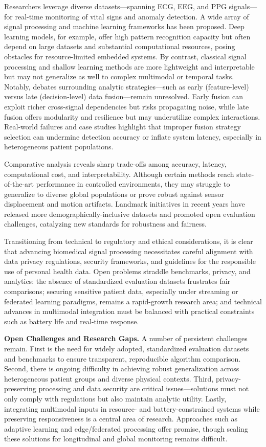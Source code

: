 \documentclass[sigconf]{acmart}
\begin{document}
Researchers leverage diverse datasets—spanning ECG, EEG, and PPG signals—for real-time monitoring of vital signs and anomaly detection. A wide array of signal processing and machine learning frameworks has been proposed. Deep learning models, for example, offer high pattern recognition capacity but often depend on large datasets and substantial computational resources, posing obstacles for resource-limited embedded systems. By contrast, classical signal processing and shallow learning methods are more lightweight and interpretable but may not generalize as well to complex multimodal or temporal tasks. Notably, debates surrounding analytic strategies—such as early (feature-level) versus late (decision-level) data fusion—remain unresolved. Early fusion can exploit richer cross-signal dependencies but risks propagating noise, while late fusion offers modularity and resilience but may underutilize complex interactions. Real-world failures and case studies highlight that improper fusion strategy selection can undermine detection accuracy or inflate system latency, especially in heterogeneous patient populations.

Comparative analysis reveals sharp trade-offs among accuracy, latency, computational cost, and interpretability. Although certain methods reach state-of-the-art performance in controlled environments, they may struggle to generalize to diverse global populations or prove robust against sensor displacement and motion artifacts. Landmark initiatives in recent years have released more demographically-inclusive datasets and promoted open evaluation challenges, catalyzing new standards for robustness and fairness.

Transitioning from technical to regulatory and ethical considerations, it is clear that advancing biomedical signal processing necessitates careful alignment with data privacy regulations, security frameworks, and guidelines for the responsible use of personal health data. Open problems straddle benchmarks, privacy, and analytics: the absence of standardized evaluation datasets frustrates fair comparisons; securing sensitive patient data, especially under streaming or federated learning paradigms, remains a rapid-growth research area; and technical advances in multimodal integration must be balanced with practical constraints such as battery life and real-time response.

\textbf{Open Challenges and Research Gaps.} A number of persistent challenges remain. First is the need for widely adopted, standardized evaluation datasets and benchmarks to ensure transparent, reproducible algorithm comparison. Second, there is ongoing difficulty in achieving robust generalization across heterogeneous patient groups and diverse physical contexts. Third, privacy-preserving processing and data security are critical issues—solutions must not only comply with regulations but also maintain analytic utility. Lastly, integrating multimodal inputs in resource- and battery-constrained systems while preserving responsiveness is a central area of research. Approaches such as adaptive learning and edge/federated processing offer promise, though scaling these solutions for longitudinal and global monitoring remains difficult.
\end{document}
